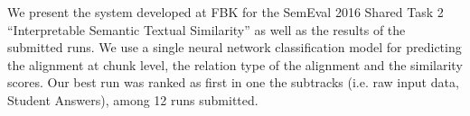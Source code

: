 We present the system developed at FBK for the SemEval 2016 Shared Task 2 ``Interpretable Semantic Textual Similarity'' as well as the results of the submitted runs. We use a single  neural network classification model for predicting the alignment at chunk level,  the relation type of the alignment and  the similarity scores. Our best run was ranked as first in one the subtracks (i.e. raw input data, Student Answers), among 12 runs submitted.
